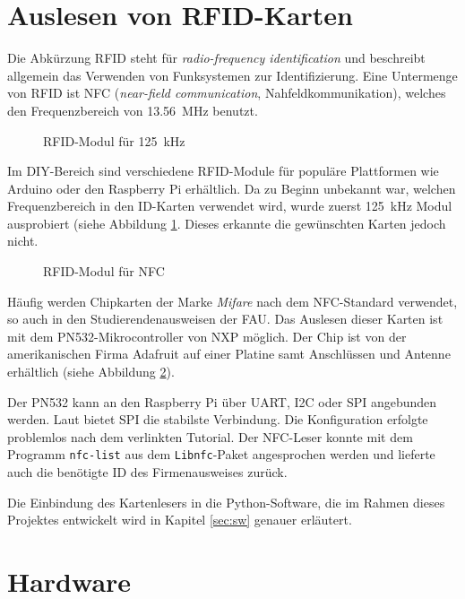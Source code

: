 \documentclass[11pt,a4paper]{IEEEtran} \usepackage[ngerman]{babel}
\begin{document}
\section{Auslesen von RFID-Karten} \label{sec:rfid}

Die Abkürzung RFID steht für \emph{radio-frequency identification} und
beschreibt allgemein das Verwenden von Funksystemen zur Identifizierung. Eine
Untermenge von RFID ist NFC (\emph{near-field communication},
Nahfeldkommunikation), welches den Frequenzbereich von \SI{13,56}{\mega\hertz}
benutzt.

\begin{figure}[ht]
    \label{fig:rfid125khz}
    \caption{RFID-Modul für \SI{125}{\kilo\hertz}}
\end{figure}

Im DIY-Bereich sind verschiedene RFID-Module für populäre Plattformen wie
Arduino oder den Raspberry Pi erhältlich. Da zu Beginn unbekannt war, welchen
Frequenzbereich in den ID-Karten verwendet wird, wurde zuerst
\SI{125}{\kilo\hertz} Modul ausprobiert (siehe Abbildung \ref{fig:rfid125khz}.
Dieses erkannte die gewünschten Karten jedoch nicht. 

\begin{figure}[ht]
    \label{fig:rfidnfc}
    \caption{RFID-Modul für NFC}
\end{figure}

Häufig werden Chipkarten der Marke \emph{Mifare} nach dem NFC-Standard
verwendet, so auch in den Studierendenausweisen der FAU\autocite{FauCARD}. Das
Auslesen dieser Karten ist mit dem PN532-Mikrocontroller von NXP möglich. Der
Chip ist von der amerikanischen Firma Adafruit\autocite{AdafruitHP} auf einer 
Platine samt Anschlüssen und Antenne erhältlich (siehe Abbildung
\ref{fig:rfidnfc}).

Der PN532 kann an den Raspberry Pi über UART, I2C oder SPI angebunden werden.
Laut \autocite{PN532Tutorial} bietet SPI die stabilste Verbindung. Die
Konfiguration erfolgte problemlos nach dem verlinkten Tutorial. Der NFC-Leser
konnte mit dem Programm \texttt{nfc-list} aus dem \texttt{Libnfc}-Paket 
angesprochen werden und lieferte auch die benötigte ID des Firmenausweises
zurück.

Die Einbindung des Kartenlesers in die Python-Software, die im Rahmen dieses 
Projektes entwickelt wird in Kapitel \ref{sec:sw} genauer erläutert.

\section{Hardware} \label{sec:hw}
\end{document}
